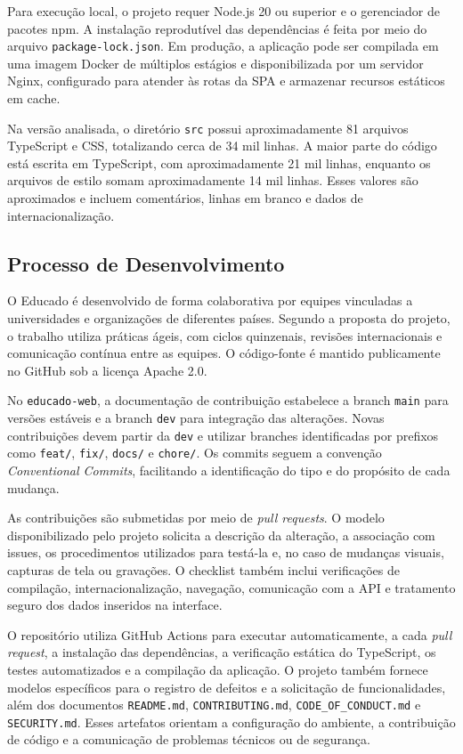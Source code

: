 Para execução local, o projeto requer Node.js 20 ou superior e o gerenciador de pacotes npm.
A instalação reprodutível das dependências é feita por meio do arquivo \texttt{package-lock.json}.
Em produção, a aplicação pode ser compilada em uma imagem Docker de múltiplos estágios e disponibilizada por um servidor Nginx, configurado para atender às rotas da SPA e armazenar recursos estáticos em cache.

Na versão analisada, o diretório \texttt{src} possui aproximadamente 81 arquivos TypeScript e CSS, totalizando cerca de 34 mil linhas.
A maior parte do código está escrita em TypeScript, com aproximadamente 21 mil linhas, enquanto os arquivos de estilo somam aproximadamente 14 mil linhas.
Esses valores são aproximados e incluem comentários, linhas em branco e dados de internacionalização.

\subsection{Processo de Desenvolvimento}

O Educado é desenvolvido de forma colaborativa por equipes vinculadas a universidades e organizações de diferentes países.
Segundo a proposta do projeto, o trabalho utiliza práticas ágeis, com ciclos quinzenais, revisões internacionais e comunicação contínua entre as equipes.
O código-fonte é mantido publicamente no GitHub sob a licença Apache 2.0.

No \texttt{educado-web}, a documentação de contribuição estabelece a branch \texttt{main} para versões estáveis e a branch \texttt{dev} para integração das alterações.
Novas contribuições devem partir da \texttt{dev} e utilizar branches identificadas por prefixos como \texttt{feat/}, \texttt{fix/}, \texttt{docs/} e \texttt{chore/}.
Os commits seguem a convenção \textit{Conventional Commits}, facilitando a identificação do tipo e do propósito de cada mudança.

As contribuições são submetidas por meio de \textit{pull requests}.
O modelo disponibilizado pelo projeto solicita a descrição da alteração, a associação com issues, os procedimentos utilizados para testá-la e, no caso de mudanças visuais, capturas de tela ou gravações.
O checklist também inclui verificações de compilação, internacionalização, navegação, comunicação com a API e tratamento seguro dos dados inseridos na interface.

O repositório utiliza GitHub Actions para executar automaticamente, a cada \textit{pull request}, a instalação das dependências, a verificação estática do TypeScript, os testes automatizados e a compilação da aplicação.
O projeto também fornece modelos específicos para o registro de defeitos e a solicitação de funcionalidades, além dos documentos \texttt{README.md}, \texttt{CONTRIBUTING.md}, \texttt{CODE\_OF\_CONDUCT.md} e \texttt{SECURITY.md}.
Esses artefatos orientam a configuração do ambiente, a contribuição de código e a comunicação de problemas técnicos ou de segurança.
